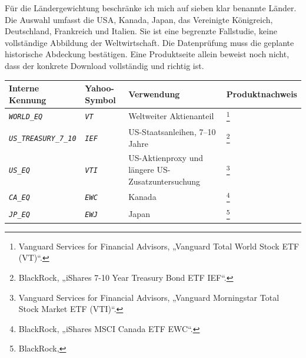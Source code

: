 \documentclass[
  ngerman,
  a4paper,
  DIV=11,
  oneside]{scrreprt}
\newcounter{none} %
\begin{document}
Für die Ländergewichtung beschränke ich mich auf sieben klar benannte
Länder. Die Auswahl umfasst die USA, Kanada, Japan, das Vereinigte
Königreich, Deutschland, Frankreich und Italien. Sie ist eine begrenzte
Fallstudie, keine vollständige Abbildung der Weltwirtschaft. Die
Datenprüfung muss die geplante historische Abdeckung bestätigen. Eine
Produktseite allein beweist noch nicht, dass der konkrete Download
vollständig und richtig ist.

{\def\LTcaptype{none} %
\begin{longtable}[]{@{}
  >{\raggedright\arraybackslash}p{}
  >{\raggedright\arraybackslash}p{}
  >{\raggedright\arraybackslash}p{}
  >{\raggedright\arraybackslash}p{}@{}}
\toprule\noalign{}
\begin{minipage}[b]{\linewidth}\raggedright
Interne Kennung
\end{minipage} & \begin{minipage}[b]{\linewidth}\raggedright
Yahoo-Symbol
\end{minipage} & \begin{minipage}[b]{\linewidth}\raggedright
Verwendung
\end{minipage} & \begin{minipage}[b]{\linewidth}\raggedright
Produktnachweis
\end{minipage} \\
\midrule\noalign{}
\endhead
\bottomrule\noalign{}
\endlastfoot
\emph{\texttt{WORLD\_EQ}} & \emph{\texttt{VT}} & Weltweiter Aktienanteil
& \footnote{Vanguard Services for Financial Advisors, {„Vanguard {Total
  World Stock ETF} ({VT})``}.} \\
\emph{\texttt{US\_TREASURY\_7\_10}} & \emph{\texttt{IEF}} &
US-Staatsanleihen, 7--10 Jahre & \footnote{BlackRock, {„{iShares} 7-10
  {Year Treasury Bond ETF} \textbar{} {IEF}``}.} \\
\emph{\texttt{US\_EQ}} & \emph{\texttt{VTI}} & US-Aktienproxy und
längere US-Zusatzuntersuchung & \footnote{Vanguard Services for
  Financial Advisors, {„Vanguard {Morningstar Total Stock Market ETF}
  ({VTI})``}.} \\
\emph{\texttt{CA\_EQ}} & \emph{\texttt{EWC}} & Kanada & \footnote{BlackRock,
  {„{iShares MSCI Canada ETF} \textbar{} {EWC}``}.} \\
\emph{\texttt{JP\_EQ}} & \emph{\texttt{EWJ}} & Japan & \footnote{BlackRock,
}
\end{longtable}}
\end{document}
